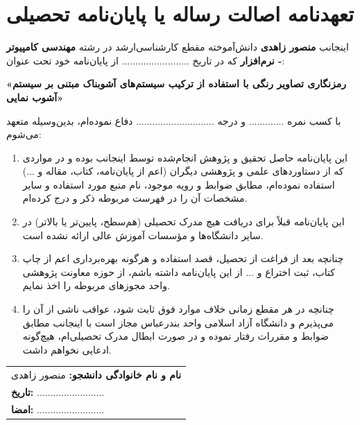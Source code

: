 \chapter*{تعهدنامه اصالت رساله یا پایان‌نامه تحصیلی}

اینجانب \textbf{منصور زاهدی} دانش‌آموخته مقطع کارشناسی‌ارشد در رشته \textbf{مهندسی کامپیوتر - نرم‌افزار} که در تاریخ ......................... از پایان‌نامه خود تحت عنوان:
\begin{center}
\textbf{«رمزنگاری تصاویر رنگی با استفاده از ترکیب سیستم‌های آشوبناک مبتنی بر سیستم آشوب نمایی»}
\end{center}
با کسب نمره ............. و درجه ............................. دفاع نموده‌ام، بدین‌وسیله متعهد می‌شوم:

\begin{enumerate}
    \item این پایان‌نامه حاصل تحقیق و پژوهش انجام‌شده توسط اینجانب بوده و در مواردی که از دستاوردهای علمی و پژوهشی دیگران (اعم از پایان‌نامه، کتاب، مقاله و ...) استفاده نموده‌ام، مطابق ضوابط و رویه موجود، نام منبع مورد استفاده و سایر مشخصات آن را در فهرست مربوطه ذکر و درج کرده‌ام.
    \item این پایان‌نامه قبلاً برای دریافت هیچ مدرک تحصیلی (هم‌سطح، پایین‌تر یا بالاتر) در سایر دانشگاه‌ها و مؤسسات آموزش عالی ارائه نشده است.
    \item چنانچه بعد از فراغت از تحصیل، قصد استفاده و هرگونه بهره‌برداری اعم از چاپ کتاب، ثبت اختراع و ... از این پایان‌نامه داشته باشم، از حوزه معاونت پژوهشی واحد مجوزهای مربوطه را اخذ نمایم.
    \item چنانچه در هر مقطع زمانی خلاف موارد فوق ثابت شود، عواقب ناشی از آن را می‌پذیرم و دانشگاه آزاد اسلامی واحد بندرعباس مجاز است با اینجانب مطابق ضوابط و مقررات رفتار نموده و در صورت ابطال مدرک تحصیلی‌ام، هیچ‌گونه ادعایی نخواهم داشت.
\end{enumerate}

\vspace{1cm}

\begin{flushleft}
\begin{tabular}{l}
\textbf{نام و نام خانوادگی دانشجو:} منصور زاهدی \\
\textbf{تاریخ:} ......................... \\
\textbf{امضا:} ......................... \\
\end{tabular}
\end{flushleft}

\newpage
